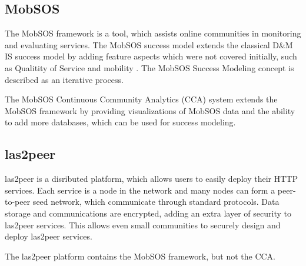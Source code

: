 \subsection{MobSOS}
The MobSOS framework is a tool, which assists online communities in monitoring and evaluating services. The MobSOS success model extends the classical D\&M IS success model by adding feature aspects which were not covered initially, such as Qualitity of Service and mobility \cite{Renz08}.
The MobSOS Success Modeling concept is described as an iterative process.

The MobSOS Continuous Community Analytics (CCA) system extends the MobSOS framework by providing visualizations of MobSOS data and the ability to add more databases, which can be used for success modeling.

\subsection{las2peer}
las2peer is a disributed platform, which allows users to easily deploy their HTTP services. Each service is a node in the network and many nodes can form a peer-to-peer seed network, which communicate through standard protocols. Data storage and communications are encrypted, adding an extra layer of security to las2peer services. This allows even small communities to securely design and deploy las2peer services.

The las2peer platform contains the MobSOS framework, but not the CCA.
